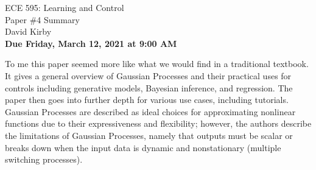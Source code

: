 \documentclass[11pt]{article}
\begin{document}
\begin{center}
\LARGE{ECE 595: Learning and Control\\Paper \#4 Summary}\\[1.5em]
\large David Kirby\\[1.5em]
\large \textbf{Due Friday, March 12, 2021 at 9:00 AM}\\[2.5em]
\end{center}

\noindent To me this paper seemed more like what we would find in a traditional textbook. It gives a general overview of Gaussian Processes and their practical uses for controls including generative models, Bayesian inference, and regression. The paper then goes into further depth for various use cases, including tutorials. Gaussian Processes are described as ideal choices for approximating nonlinear functions due to their expressiveness and flexibility; however, the authors describe the limitations of Gaussian Processes, namely that outputs must be scalar or breaks down when the input data is dynamic and nonstationary (multiple switching processes).
\end{document}
